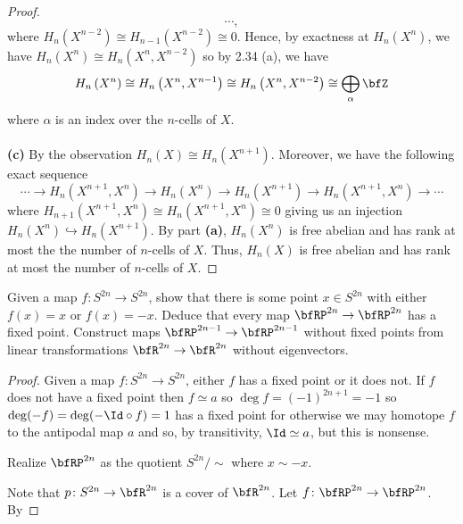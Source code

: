 \begin{proof}
\begin{equation}
\cdots,
\end{equation}
where $H_n\left(X^{n-2}\right)\cong H_{n-1}\left(X^{n-2}\right)\cong
0$. Hence, by exactness at $H_n\left(X^n\right)$, we have
$H_n\left(X^n\right)\cong H_n\left(X^n,X^{n-2}\right)$ so by 2.34 (a), we
have
\[
H_n\left(X^n\right)\cong
H_n\left(X^n,X^{n-1}\right)\cong
H_n\left(X^n,X^{n-2}\right)\cong\bigoplus_\alpha\bfZ
\]
where $\alpha$ is an index over the $n$-cells of $X$.
\\\\
\textbf{(c)} By the observation $H_n(X)\cong
H_n\left(X^{n+1}\right)$. Moreover, we have the following exact sequence
\begin{equation}
  \label{eq:short-exact-cells-2}
\cdots\longrightarrow
H_n\left(X^{n+1},X^n\right)\longrightarrow
H_n\left(X^n\right)\longrightarrow
H_n\left(X^{n+1}\right)\longrightarrow
H_n\left(X^{n+1},X^n\right)\longrightarrow\cdots
\end{equation}
where $H_{n+1}\left(X^{n+1},X^n\right)\cong
H_n\left(X^{n+1},X^n\right)\cong 0$ giving us an injection
$H_n\left(X^n\right)\hookrightarrow H_n\left(X^{n+1}\right)$. By part
\textbf{(a)}, $H_n\left(X^n\right)$ is free abelian and has rank at most
the the number of $n$-cells of $X$. Thus, $H_n\left(X\right)$ is free abelian
and has rank at most the number of $n$-cells of $X$.
\end{proof}
\newpage

\begin{problem}[Hatcher {\S}2.2, Ex.\@ 2]
Given a map $f\colon S^{2n}\to S^{2n}$, show that there is some point $x\in
S^{2n}$ with either $f(x)=x$ or $f(x)=-x$. Deduce that every map
$\bfRP^{2n}\to\bfRP^{2n}$ has a fixed point. Construct maps
$\bfRP^{2n-1}\to\bfRP^{2n-1}$ without fixed points from linear
transformations $\bfR^{2n}\to\bfR^{2n}$ without eigenvectors.
\end{problem}
\begin{proof}
Given a map $f\colon S^{2n}\to S^{2n}$, either $f$ has a fixed point or it
does not. If $f$ does not have a fixed point then $f\simeq a$ so $\deg
f=(-1)^{2n+1}=-1$ so $\deg(-f)=\deg(-\Id\circ f)=1$ has a fixed point for
otherwise we may homotope $f$  to the antipodal map $a$ and so, by
transitivity, $\Id\simeq a$, but this is nonsense.

Realize $\bfRP^{2n}$ as the quotient $S^{2n}/\sim$ where $x\sim -x$.

Note that $p\colon S^{2n}\to\bfR^{2n}$ is a cover of $\bfR^{2n}$.
Let $f\colon\bfRP^{2n}\to\bfRP^{2n}$. By
\end{proof}

